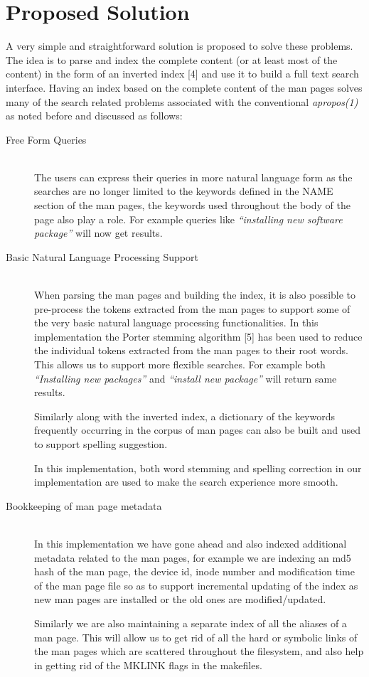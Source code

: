 \documentclass[titlepage, a4paper, 12pt]{article}
\begin{document}
\section{Proposed Solution}
A very simple and straightforward solution is proposed to solve these problems.
The idea is to parse and index
the complete content (or at least most of the content) in the form of an
inverted index [4] and use it to build a full text search
interface. Having an index based on the complete content of the man pages solves
many of the search
related problems associated with the conventional \textit{apropos(1)} as noted
before and discussed as follows:
\begin{description}
\item[Free Form Queries] \hfill \\
The users can express their queries in more natural language form as the searches
are no longer limited to the keywords defined in the NAME section of the man
pages, the keywords used throughout the body of the page also play a role.
For example queries like \textit{``installing new software package''}
will now get results.
\end{description}
\begin{description}
\item[Basic Natural Language Processing Support] \hfill \\
When parsing the man pages and building the index, it is also possible to
pre-process the tokens extracted from the man pages to support some of the very
basic natural language processing functionalities. In this implementation the
Porter stemming algorithm [5] has been used to
reduce the individual tokens extracted from the man pages to their root words.
This allows us to support more flexible searches. For example both
\textit{``Installing new packages''} and \textit{``install new package''} will
return same results.

Similarly along with the inverted index, a dictionary of the keywords frequently
occurring in the corpus of man pages can also be built and used to support
spelling suggestion.

In this implementation, both word stemming and spelling correction in our implementation are used to make the search experience more smooth.
\end{description}
\begin{description}
\item[Bookkeeping of man page metadata] \hfill \\
In this implementation we have gone ahead and also indexed additional metadata
related to the man pages, for example we are indexing an md5 hash of the man
page, the device id, inode number and modification time of the man page file so
as to support incremental updating of the index as new man pages are installed
or the old ones are modified/updated.

Similarly we are also maintaining a separate index of all the aliases of a man
page. This will allow us to get rid of all the hard or symbolic links of the man
pages which are scattered throughout the filesystem, and also help in getting rid
of the MKLINK flags in the makefiles.
\end{description}
\end{document}
